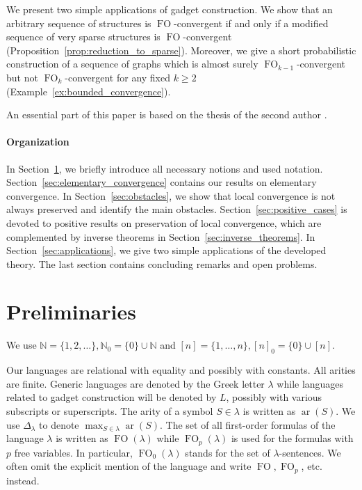 \documentclass[11pt]{article}
\theoremstyle{plain}
\theoremstyle{definition}
\theoremstyle{remark}
\DeclareMathOperator\aritysym{ar}
\newcommand{\arity}[1]{{\aritysym({#1})}}
\newcommand{\N}{\mathbb{N}}
\DeclareMathOperator\FO{FO}
\newcommand{\maxarity}[1]{\Delta_{#1}}
\begin{document}
We present two simple applications of gadget construction.
We show that an arbitrary sequence of structures is $\FO$-convergent if and only if a modified sequence of very sparse structures is $\FO$-convergent (Proposition~\ref{prop:reduction_to_sparse}).
Moreover, we give a short probabilistic construction of a sequence of graphs which is almost surely $\FO_{k-1}$-convergent but not $\FO_k$-convergent for any fixed $k \geq 2$ (Example~\ref{ex:bounded_convergence}).

An essential part of this paper is based on the thesis of the second author \cite{diploma_thesis}.

\paragraph*{Organization}
In Section~\ref{sec:prelim}, we briefly introduce all necessary notions and used notation.
Section~\ref{sec:elementary_convergence} contains our results on elementary convergence.
In Section~\ref{sec:obstacles}, we show that local convergence is not always preserved and identify the main obstacles.
Section~\ref{sec:positive_cases} is devoted to positive results on preservation of local convergence, which are complemented by inverse theorems in Section~\ref{sec:inverse_theorems}.
In Section~\ref{sec:applications}, we give two simple applications of the developed theory.
The last section contains concluding remarks and open problems. \section{Preliminaries}\label{sec:prelim}

We use $\N = \{1, 2, \dots\}, \N_0 = \{0\} \cup \N$ and $[n] = \{1, \dots, n\}, [n]_0 = \{0\} \cup [n]$.

Our languages are relational with equality and possibly with constants.
All arities are finite.
Generic languages are denoted by the Greek letter $\lambda$ while languages related to gadget construction will be denoted by $L$, possibly with various subscripts or superscripts.
The arity of a symbol $S \in \lambda$ is written as $\arity{S}$.
We use $\maxarity{\lambda}$ to denote $\max_{S \in \lambda} \arity{S}$.
The set of all first-order formulas of the language $\lambda$ is written as $\FO(\lambda)$ while $\FO_p(\lambda)$ is used for the formulas with $p$ free variables.
In particular, $\FO_0(\lambda)$ stands for the set of $\lambda$-sentences.
We often omit the explicit mention of the language and write $\FO, \FO_p$, etc. instead.
\end{document}
